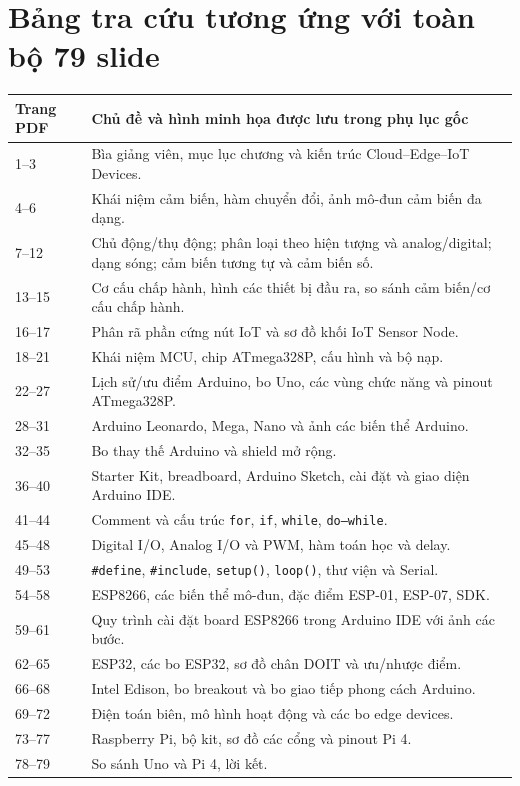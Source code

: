 \section{Bảng tra cứu tương ứng với toàn bộ 79 slide}
\begin{longtable}{p{.15\linewidth}p{.76\linewidth}}\toprule\textbf{Trang PDF} & \textbf{Chủ đề và hình minh họa được lưu trong phụ lục gốc}\\\midrule\endhead
1--3 & Bìa giảng viên, mục lục chương và kiến trúc Cloud--Edge--IoT Devices.\\
4--6 & Khái niệm cảm biến, hàm chuyển đổi, ảnh mô-đun cảm biến đa dạng.\\
7--12 & Chủ động/thụ động; phân loại theo hiện tượng và analog/digital; dạng sóng; cảm biến tương tự và cảm biến số.\\
13--15 & Cơ cấu chấp hành, hình các thiết bị đầu ra, so sánh cảm biến/cơ cấu chấp hành.\\
16--17 & Phân rã phần cứng nút IoT và sơ đồ khối IoT Sensor Node.\\
18--21 & Khái niệm MCU, chip ATmega328P, cấu hình và bộ nạp.\\
22--27 & Lịch sử/ưu điểm Arduino, bo Uno, các vùng chức năng và pinout ATmega328P.\\
28--31 & Arduino Leonardo, Mega, Nano và ảnh các biến thể Arduino.\\
32--35 & Bo thay thế Arduino và shield mở rộng.\\
36--40 & Starter Kit, breadboard, Arduino Sketch, cài đặt và giao diện Arduino IDE.\\
41--44 & Comment và cấu trúc \texttt{for}, \texttt{if}, \texttt{while}, \texttt{do--while}.\\
45--48 & Digital I/O, Analog I/O và PWM, hàm toán học và delay.\\
49--53 & \texttt{\#define}, \texttt{\#include}, \texttt{setup()}, \texttt{loop()}, thư viện và Serial.\\
54--58 & ESP8266, các biến thể mô-đun, đặc điểm ESP-01, ESP-07, SDK.\\
59--61 & Quy trình cài đặt board ESP8266 trong Arduino IDE với ảnh các bước.\\
62--65 & ESP32, các bo ESP32, sơ đồ chân DOIT và ưu/nhược điểm.\\
66--68 & Intel Edison, bo breakout và bo giao tiếp phong cách Arduino.\\
69--72 & Điện toán biên, mô hình hoạt động và các bo edge devices.\\
73--77 & Raspberry Pi, bộ kit, sơ đồ các cổng và pinout Pi 4.\\
78--79 & So sánh Uno và Pi 4, lời kết.\\\bottomrule\end{longtable}
